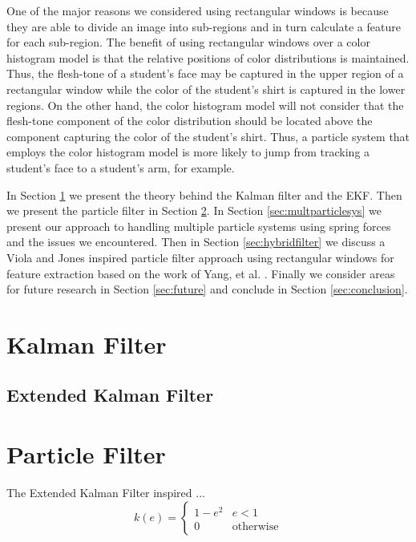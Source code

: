 \documentclass[12pt]{article}
\begin{document}
One of the major reasons we considered using rectangular windows is because they are able to divide an image into sub-regions and in turn calculate a feature for each sub-region. The benefit of using rectangular windows over a color histogram model is that the relative positions of color distributions is maintained. Thus, the flesh-tone of a student's face may be captured in the upper region of a rectangular window while the color of the student's shirt is captured in the lower regions. On the other hand, the color histogram model will not consider that the flesh-tone component of the color distribution should be located above the component capturing the color of the student's shirt. Thus, a particle system that employs the color histogram model is more likely to jump from tracking a student's face to a student's arm, for example.

In Section \ref{sec:kalmanfilter} we present the theory behind the Kalman filter and the EKF. Then we present the particle filter in Section \ref{sec:particlefilter}. In Section \ref{sec:multparticlesys} we present our approach to handling multiple particle systems using spring forces and the issues we encountered. Then in Section \ref{sec:hybridfilter} we discuss a Viola and Jones inspired particle filter approach using rectangular windows for feature extraction based on the work of Yang, et al. \cite{hybrid}. Finally we consider areas for future research in Section \ref{sec:future} and conclude in Section \ref{sec:conclusion}.
  

\section{Kalman Filter}
\label{sec:kalmanfilter}

\subsection{Extended Kalman Filter}



\section{Particle Filter}
\label{sec:particlefilter}

The Extended Kalman Filter inspired ...  \\

\begin{equation}
k(e) = \begin{cases}
 1 - e^2  & \text{$e < 1$} \\
 0            & \text{otherwise}
\end{cases}
\label{eq:kdist}
\end{equation} \\
\end{document}

